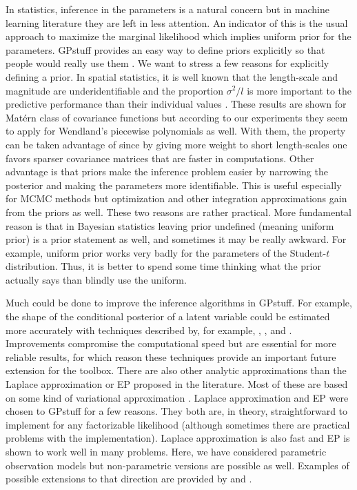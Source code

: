 \documentclass[twoside,11pt]{article}
\newcommand{\pkg}[1]{{\fontseries{b}\selectfont #1}}
\begin{document}
In statistics, inference in the parameters is a natural concern but in
machine learning literature they are left in less attention. An
indicator of this is the usual approach to maximize the marginal
likelihood which implies uniform prior for the parameters.
\pkg{GPstuff} provides an easy way to define priors explicitly so that
people would really use them \citep[this principle is also in line
with reasoning by][]{Gelman:2006}. We want to stress a few reasons for
explicitly defining a prior. In spatial statistics, it is well known
that the length-scale and magnitude are underidentifiable and the
proportion $\sigma^2/l$ is more important to the predictive
performance than their individual values
\citep{Diggle+Tawn+Moyeed:1998,Zhang:2004,Diggle+Ribeiro:2007}. These
results are shown for Mat{\'e}rn class of covariance functions but
according to our experiments they seem to apply for Wendland's
piecewise polynomials as well. With them, the property can be taken
advantage of since by giving more weight to short length-scales one
favors sparser covariance matrices that are faster in computations.
Other advantage is that priors make the inference problem easier by
narrowing the posterior and making the parameters more identifiable.
This is useful especially for MCMC methods but optimization and other
integration approximations gain from the priors as well. These two
reasons are rather practical. More fundamental reason is that in
Bayesian statistics leaving prior undefined (meaning uniform prior) is
a prior statement as well, and sometimes it may be really awkward. For
example, uniform prior works very badly for the parameters of the
Student-$t$ distribution. Thus, it is better to spend some time
thinking what the prior actually says than blindly use the uniform.

Much could be done to improve the inference algorithms in
\pkg{GPstuff}. For example, the shape of the conditional posterior of
a latent variable could be estimated more accurately with techniques
described by, for example, \citet{Rue+Martino+Chopin:2009},
\citet{Paquet+Winther+Opper:2009}, and \citet{Cseke+Heskes:2010}
\citep[see also][]{Tierney+Kadane:1986}. Improvements compromise the
computational speed but are essential for more reliable results, for
which reason these techniques provide an important future extension
for the toolbox. There are also other analytic approximations than the
Laplace approximation or EP proposed in the literature. Most of these
are based on some kind of variational approximation
\citep{Gibbs+MacKay:2000,Csato+Opper:2002,Tipping+Lawrence:2005,Kuss:2006,Opper+Archambeau:2009}.
Laplace approximation and EP were chosen to \pkg{GPstuff} for a few
reasons. They both are, in theory, straightforward to implement for
any factorizable likelihood (although sometimes there are practical
problems with the implementation). Laplace approximation is also fast
and EP is shown to work well in many problems. Here, we have
considered parametric observation models but non-parametric versions
are possible as well. Examples of possible extensions to that
direction are provided by \citet{Snelson+Rasmussen+Ghahramani:2004}
and \citet{Tokdar+Zhu+Ghosh:2010}.
\end{document}
